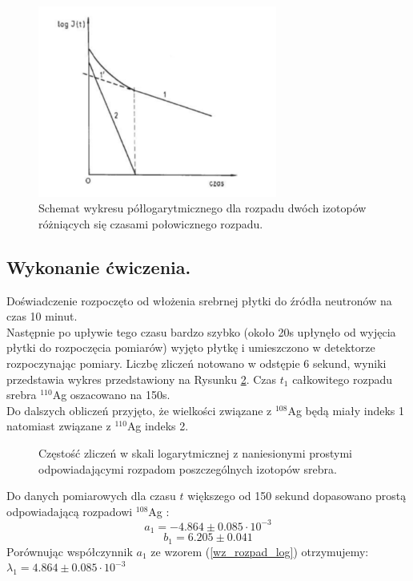 \documentclass{article}
\begin{document}
\begin{figure}[h]
	\centering
	\includegraphics[width=0.7\textwidth]{images/schemat.png}
	\caption{Schemat wykresu półlogarytmicznego dla rozpadu dwóch izotopów różniących się czasami połowicznego rozpadu.}
	\label{schemat}
\end{figure}



\subsection{Wykonanie ćwiczenia.}
Doświadczenie rozpoczęto od włożenia srebrnej płytki do źródła neutronów na czas 10 minut.\\
Następnie po upływie tego czasu bardzo szybko (około 20s upłynęło od wyjęcia płytki do rozpoczęcia pomiarów) wyjęto płytkę i umieszczono w detektorze  rozpoczynając pomiary. Liczbę zliczeń notowano w odstępie 6 sekund, wyniki przedstawia  wykres przedstawiony na Rysunku \ref{wykres_zliczenia_czas}. Czas $t_1$ całkowitego rozpadu srebra $^{110}$Ag oszacowano na 150s.\\
Do dalszych obliczeń przyjęto, że wielkości związane z $^{108}$Ag będą miały indeks 1 natomiast związane z $^{110}$Ag indeks 2.\\

\begin{figure}[h!]
	\fontsize{6}{8}\selectfont %
	\centering
	\resizebox{1.0\textwidth}{!}{}	
	
	\caption{Częstość zliczeń w skali logarytmicznej z naniesionymi prostymi odpowiadającymi rozpadom poszczególnych izotopów srebra.}
	\label{wykres_zliczenia_czas}
\end{figure}

Do danych pomiarowych dla czasu $t$ większego od 150 sekund dopasowano prostą odpowiadającą rozpadowi $^{108}$Ag : \\
\[a_1 = -4.864 \pm 0.085 \cdot 10^{-3}
\]
\[	b_1 = 6.205 \pm 0.041
\]
Porównując współczynnik $a_1$ ze wzorem (\ref{wz_rozpad_log}) otrzymujemy:\\
$\lambda _1 =  4.864 \pm 0.085 \cdot 10^{-3}$\\\\
\end{document}
